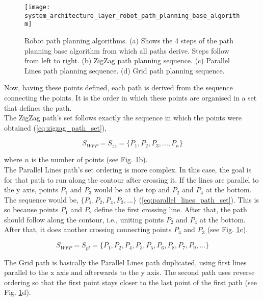\begin{figure}[htbp]
	\centering
	\texttt{[image: system\_architecture\_layer\_robot\_path\_planning\_base\_algorithm]}
	\caption[Robot path planning algorithms.]{Robot path planning algorithms. (a) Shows the 4 steps of the path planning base algorithm from which all paths derive. Steps follow from left to right. (b) ZigZag path planning sequence. (c) Parallel Lines path planning sequence. (d) Grid path planning sequence.}
	\label{fig:system_architecture_layer_robot_path_planning_base_algorithm}
\end{figure}

Now, having these points defined, each path is derived from the sequence connecting the points. It is the order in which these points are organised in a set that defines the path.\\

The ZigZag path's set follows exactly the sequence in which the points were obtained (\ref{eq:zigzag_path_set}),

\begin{equation}
\label{eq:zigzag_path_set}
    S_{WFP} = S_{zz} = \{ P_1, P_2, P_3, ..., P_n \}
\end{equation}

where $n$ is the number of points (see Fig. \ref{fig:system_architecture_layer_robot_path_planning_base_algorithm}b).\\

The Parallel Lines path's set ordering is more complex. In this case, the goal is for that path to run along the contour after crossing it. If the lines are parallel to the y axis, points $P_1$ and $P_3$ would be at the top and $P_2$ and $P_4$ at the bottom. The sequence would be, $\{P_1, P_2, P_4, P_3, ...\}$ (\ref{eq:parallel_lines_path_set}). This is so because points $P_1$ and $P_2$ define the first crossing line. After that, the path should follow along the contour, i.e., uniting points $P_2$ and $P_4$ at the bottom. After that, it does another crossing connecting points $P_4$ and $P_3$ (see Fig. \ref{fig:system_architecture_layer_robot_path_planning_base_algorithm}c).

\begin{equation}
\label{eq:parallel_lines_path_set}
    S_{WFP} = S_{pl} = \{ P_1, P_2, P_4, P_3, P_5, P_6, P_8, P_7, P_9, ... \}
\end{equation}

The Grid path is basically the Parallel Lines path duplicated, using first lines parallel to the x axis and afterwards to the y axis. The second path uses reverse ordering so that the first point stays closer to the last point of the first path (see Fig. \ref{fig:system_architecture_layer_robot_path_planning_base_algorithm}d).\\

